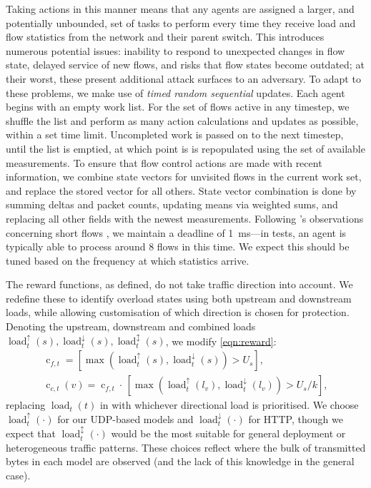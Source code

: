\documentclass[conference, letterpaper, 10pt, times]{IEEEtran}
\newcommand{\fakepara}[1]{\noindent\textbf{#1:}}
\begin{document}
Taking actions in this manner means that any agents are assigned a larger, and potentially unbounded, set of tasks to perform every time they receive load and flow statistics from the network and their parent switch.
This introduces numerous potential issues: inability to respond to unexpected changes in flow state, delayed service of new flows, and risks that flow states become outdated; at their worst, these present additional attack surfaces to an adversary.
To adapt to these problems, we make use of \emph{timed random sequential} updates.
Each agent begins with an empty work list.
For the set of flows active in any timestep, we shuffle the list and perform as many action calculations and updates as possible, within a set time limit.
Uncompleted work is passed on to the next timestep, until the list is emptied, at which point is is repopulated using the set of available measurements.
To ensure that flow control actions are made with recent information, we combine state vectors for unvisited flows in the current work set, and replace the stored vector for all others.
State vector combination is done by summing deltas and packet counts, updating means via weighted sums, and replacing all other fields with the newest measurements.
Following \citeauthor{DBLP:conf/sigcomm/ChenL0L18}'s observations concerning short flows \cite{DBLP:conf/sigcomm/ChenL0L18}, we maintain a deadline of \SI{1}{\milli\second}---in tests, an agent is typically able to process around 8 flows in this time.
We expect this should be tuned based on the frequency at which statistics arrive.

\newcommand{\arrload}[2]{\operatorname{load}^{#2}_{t}(#1)}
\newcommand{\uload}[1]{\arrload{#1}{\uparrow}}
\newcommand{\dload}[1]{\arrload{#1}{\downarrow}}
\newcommand{\bload}[1]{\arrload{#1}{\updownarrow}}
\newcommand{\cond}[2]{\operatorname{c}_{#1,t}#2}
The reward functions, as defined, do not take traffic direction into account.
We redefine these to identify overload states using both upstream and downstream loads, while allowing customisation of which direction is chosen for protection.
Denoting the upstream, downstream and combined loads $\uload{s}, \dload{s}, \bload{s}$, we modify \cref{eqn:reward}:
\begin{subequations}
\begin{gather}
\cond{f} = [\max(\uload{s}, \dload{s}) > U_s],\\
\cond{c}{(v)} = \cond{f}{} \cdot{} \, [\max(\uload{l_v}, \dload{l_v}) > U_s/k],
\end{gather}
\label{eqn:reward-but-better}
\end{subequations}
replacing $\arrload{t}{}$ in  with whichever directional load is prioritised.
We choose $\uload{\cdot}$ for our UDP-based models and $\dload{\cdot}$ for HTTP, though we expect that $\bload{\cdot}$ would be the most suitable for general deployment or heterogeneous traffic patterns.
These choices reflect where the bulk of transmitted bytes in each model are observed (and the lack of this knowledge in the general case).
\end{document}
